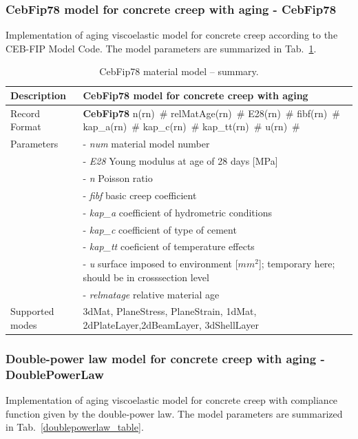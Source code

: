 \documentclass[a4paper]{article}
\newcommand{\descitem}[1]{{\noindent \bf #1}}
\newcommand{\elemparam}[2]{{{#1\tiny (#2)}~\#}}
\newcommand{\param}[1]{{\it #1}}
\begin{document}
\subsubsection{CebFip78 model for concrete creep with aging - CebFip78}
Implementation of aging viscoelastic model for concrete creep
according to the CEB-FIP Model Code.
The model parameters are summarized
in Tab.~\ref{cebfip_table}.

\begin{table}[!htb]
\begin{tabular}{|l|p{9cm}|}
\hline
Description & CebFip78 model  for concrete creep with aging\\
\hline
Record Format & \descitem{CebFip78}  \elemparam{n}{rn}
\elemparam{relMatAge}{rn} \elemparam{E28}{rn} \elemparam{fibf}{rn} \elemparam{kap\_a}{rn}
\elemparam{kap\_c}{rn} \elemparam{kap\_tt}{rn} \elemparam{u}{rn}\\
Parameters &- \param{num} material model number\\
&- \param{E28} Young modulus at age of 28 days [MPa]\\
&- \param{n} Poisson ratio\\
&- \param{fibf} basic creep coefficient\\
&- \param{kap\_a} coefficient of hydrometric conditions\\
&- \param{kap\_c} coefficient of type of cement\\
&- \param{kap\_tt} coeficient of temperature effects\\
&- \param{u} surface imposed to environment [$mm^2$]; temporary here; should be in crosssection level\\
&- \param{relmatage} relative material age \\
Supported modes& 3dMat, PlaneStress, PlaneStrain, 1dMat,
2dPlateLayer,2dBeamLayer, 3dShellLayer\\
\hline
\end{tabular}
\caption{CebFip78 material model -- summary.}
\label{cebfip_table}
\end{table}



\subsubsection{Double-power law model for concrete creep with aging - DoublePowerLaw}
Implementation of aging viscoelastic model for concrete creep
with compliance function given by the double-power law.
The model parameters are summarized
in Tab.~\ref{doublepowerlaw_table}.
\end{document}
